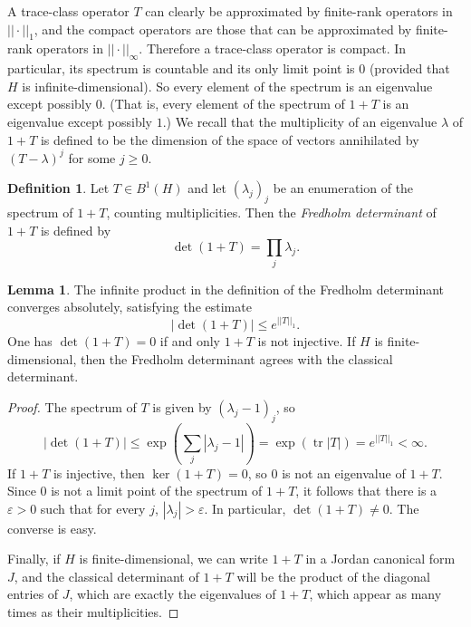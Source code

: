 \documentclass[12pt]{report}
\newcommand{\dfn}[1]{\emph{#1}\index{#1}}
\newcommand{\tr}{\operatorname{tr}}
\theoremstyle{definition}
\newtheorem{lemma}[theorem]{Lemma}
\newtheorem{definition}[theorem]{Definition}
\begin{document}
A trace-class operator $T$ can clearly be approximated by finite-rank operators in $||\cdot||_1$, and the compact operators are those that can be approximated by finite-rank operators in $||\cdot||_\infty$. Therefore a trace-class operator is compact. In particular, its spectrum is countable and its only limit point is $0$ (provided that $H$ is infinite-dimensional). So every element of the spectrum is an eigenvalue except possibly $0$. (That is, every element of the spectrum of $1 + T$ is an eigenvalue except possibly $1$.) We recall that the multiplicity of an eigenvalue $\lambda$ of $1 + T$ is defined to be the dimension of the space of vectors annihilated by $(T - \lambda)^j$ for some $j \geq 0$.
\begin{definition}
Let $T \in B^1(H)$ and let $(\lambda_j)_j$ be an enumeration of the spectrum of $1 + T$, counting multiplicities. Then the \dfn{Fredholm determinant} of $1 + T$ is defined by
$$\det(1 + T) = \prod_j \lambda_j.$$
\end{definition}
\begin{lemma}
The infinite product in the definition of the Fredholm determinant converges absolutely, satisfying the estimate
$$|\det(1 + T)| \leq e^{||T||_1}.$$
One has $\det(1 + T) = 0$ if and only $1 + T$ is not injective. If $H$ is finite-dimensional, then the Fredholm determinant agrees with the classical determinant.
\end{lemma}
\begin{proof}
The spectrum of $T$ is given by $(\lambda_j - 1)_j$, so
$$|\det(1 + T)| \leq \exp\left(\sum_j |\lambda_j - 1|\right) = \exp(\tr|T|) = e^{||T||_1} < \infty.$$
If $1 + T$ is injective, then $\ker(1 + T) = 0$, so $0$ is not an eigenvalue of $1 + T$. Since $0$ is not a limit point of the spectrum of $1 + T$, it follows that there is a $\varepsilon > 0$ such that for every $j$, $|\lambda_j| > \varepsilon$. In particular, $\det(1 + T) \neq 0$. The converse is easy.

Finally, if $H$ is finite-dimensional, we can write $1 + T$ in a Jordan canonical form $J$, and the classical determinant of $1 + T$ will be the product of the diagonal entries of $J$, which are exactly the eigenvalues of $1 + T$, which appear as many times as their multiplicities.
\end{proof}
\end{document}

